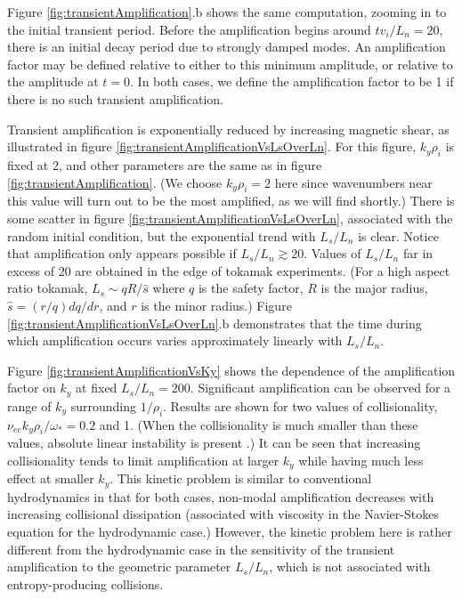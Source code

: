 \documentclass[12pt,superscriptaddress]{revtex4}
\newcommand{\nuee}{\nu_{ee}}
\begin{document}
Figure \ref{fig:transientAmplification}.b shows the same computation, zooming in to the initial transient period.
Before the amplification begins around $t v_i/L_n=20$, there is an initial decay period due to strongly
damped modes. An amplification factor may be defined relative to either to this minimum amplitude,
or relative to the amplitude at $t=0$.
In both cases, we define the amplification factor to be 1
if there is no such transient amplification.


Transient amplification is exponentially reduced by increasing magnetic shear,
as illustrated in figure \ref{fig:transientAmplificationVsLsOverLn}.
For this figure, $k_y \rho_i$ is fixed at 2, and other parameters
are the same as in figure \ref{fig:transientAmplification}.
(We choose $k_y \rho_i=2$ here since
wavenumbers near this value will turn out to be the most
amplified, as we will find shortly.)
There is some scatter in figure \ref{fig:transientAmplificationVsLsOverLn}, associated with the random initial condition,
but the exponential trend with $L_s/L_n$ is clear.
Notice that amplification only appears possible if $L_s/L_n \gtrsim 20$.
Values of $L_s/L_n$ far in excess of 20 are obtained in the edge of tokamak experiments.
(For a high aspect ratio tokamak, $L_s \sim qR/\hat{s}$ where $q$ is the safety factor, $R$ is
the major radius, $\hat{s} = (r/q) dq/dr$, and $r$ is the minor radius.)
Figure \ref{fig:transientAmplificationVsLsOverLn}.b demonstrates that the time during which amplification occurs
varies approximately linearly with $L_s/L_n$.

Figure \ref{fig:transientAmplificationVsKy} shows the dependence
of the amplification factor on $k_y$ at fixed $L_s/L_n = 200$.
Significant amplification can be observed for a range of $k_y$ surrounding
$1/\rho_i$.
Results are shown for two values of collisionality,
$\nuee k_y \rho_i / \omega_*= 0.2$ and 1.
(When the collisionality is much smaller than these values,
absolute linear instability is present \cite{usUniversalInstability}.)
It can be seen that increasing collisionality tends to limit amplification
at larger $k_y$ while having much less effect at smaller $k_y$.
This kinetic problem is similar to conventional hydrodynamics in that for both cases, non-modal amplification
decreases with increasing collisional dissipation (associated with viscosity in the Navier-Stokes equation
for the hydrodynamic case.)
However, the kinetic problem here is rather different
from the hydrodynamic case in the sensitivity of the transient amplification
to the geometric parameter $L_s/L_n$,
which is not associated with entropy-producing collisions.
\end{document}
